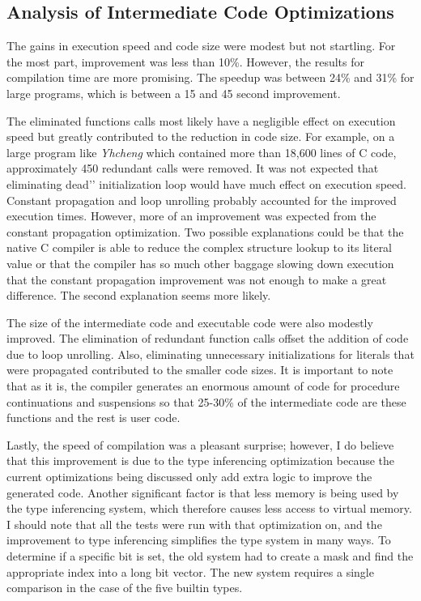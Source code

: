 \subsection{Analysis of Intermediate Code Optimizations}

The gains in execution speed and code size were modest but not
startling. For the most part, improvement was less than 10\%.
However, the results for compilation time are more promising. The
speedup was between 24\% and 31\% for large programs, which is between
a 15 and 45 second improvement.

The eliminated functions calls most likely have a negligible effect on
execution speed but greatly contributed to the reduction in code
size. For example, on a large program like \textit{Yhcheng} which
contained more than 18,600 lines of C code, approximately 450
redundant calls were removed. It was not expected that eliminating
{\textasciigrave}{\textasciigrave}dead'{}' initialization loop would
have much effect on execution speed. Constant propagation and loop
unrolling probably accounted for the improved execution
times. However, more of an improvement was expected from the constant
propagation optimization. Two possible explanations could be that the
native C compiler is able to reduce the complex structure lookup to
its literal value or that the compiler has so much other baggage
slowing down execution that the constant propagation improvement was
not enough to make a great difference. The second explanation seems
more likely.

The size of the intermediate code and executable code were also
modestly improved. The elimination of redundant function calls offset
the addition of code due to loop unrolling. Also, eliminating
unnecessary initializations for literals that were propagated
contributed to the smaller code sizes. It is important to note that as
it is, the compiler generates an enormous amount of code for procedure
continuations and suspensions so that 25-30\% of the intermediate code
are these functions and the rest is user code.


Lastly, the speed of compilation was a pleasant surprise; however, I
do believe that this improvement is due to the type inferencing
optimization because the current optimizations being discussed only
add extra logic to improve the generated code. Another significant
factor is that less memory is being used by the type inferencing
system, which therefore causes less access to virtual memory. I should
note that all the tests were run with that optimization on, and the
improvement to type inferencing simplifies the type system in many
ways. To determine if a specific bit is set, the old system had to
create a mask and find the appropriate index into a long bit
vector. The new system requires a single comparison in the case of the
five builtin types.

